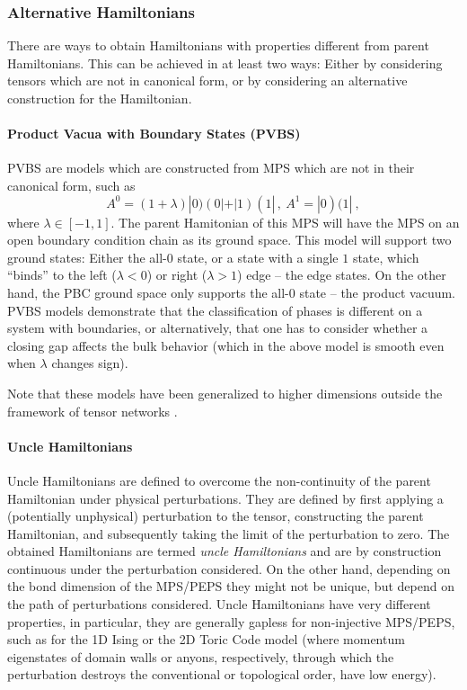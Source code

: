 \documentclass[rmp,aps,reprint,superscriptaddress,nobalancelastpage]{revtex4-1}
\begin{document}
    \subsubsection{Alternative Hamiltonians}

    There are ways to obtain Hamiltonians with properties different from parent Hamiltonians. This can be achieved in at least two ways: Either by considering tensors which are not in canonical form, or by considering an alternative construction for the Hamiltonian.

    \paragraph{Product Vacua with Boundary States (PVBS)}
    PVBS \cite{bachmann:pvbs-prb,bachmann:pvbs-cmp} are models which are constructed from MPS which are not in their canonical form, such as
    $$
        A^0=(1+\lambda) |0)(0|+|1)(1|\,,\ A^1=|0)(1|\ ,
    $$
    where $\lambda\in[-1,1]$.
    The parent Hamitonian of this MPS will have the MPS on an open boundary condition chain as its ground space.  This model will support two ground states: Either the all-$0$ state, or a state with a single $1$ state, which ``binds'' to the left ($\lambda<0$) or right ($\lambda>1$) edge -- the edge states. On the other hand, the PBC ground space only supports the all-$0$ state -- the product vacuum. PVBS models demonstrate that the classification of phases is different on a system with boundaries, or alternatively, that one has to consider whether a closing gap affects the bulk behavior (which in the above model is smooth even when $\lambda$ changes sign).

    Note that these models have been generalized to higher dimensions outside the framework of tensor networks \cite{bachmann:pvbs-higherdim}.


    \paragraph{Uncle Hamiltonians}
    Uncle Hamiltonians \cite{fernandez:1d-uncle,fernandez-gonzalez:uncle-long} are defined to overcome the non-continuity of the parent Hamiltonian under physical perturbations. They are defined by first applying a
    (potentially unphysical) perturbation to the tensor, constructing the parent Hamiltonian, and subsequently taking the limit of the perturbation to zero.  The obtained Hamiltonians are termed \emph{uncle Hamiltonians} and are by construction continuous under the perturbation considered.  On the other hand, depending on the bond dimension of the MPS/PEPS they might not be unique, but depend on the path of perturbations considered.  Uncle Hamiltonians have very different properties, in particular, they are generally gapless for non-injective MPS/PEPS, such as for the 1D Ising or the 2D Toric Code model (where momentum eigenstates of domain walls or anyons, respectively, through which the perturbation destroys the conventional or topological order, have low energy).
\end{document}
